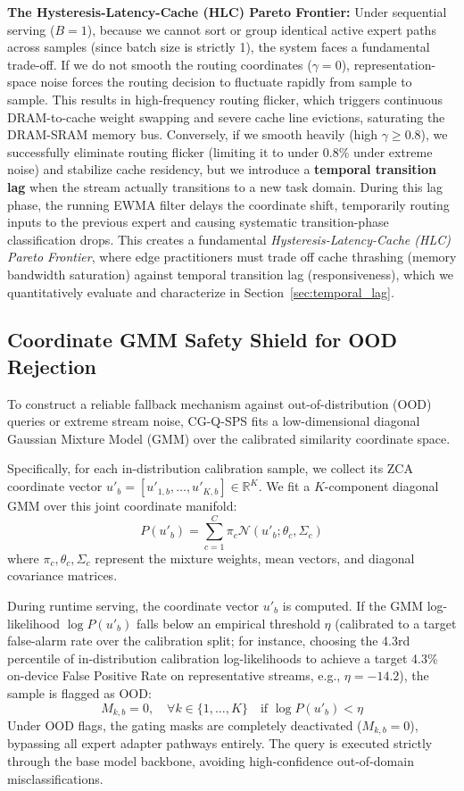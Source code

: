 \textbf{The Hysteresis-Latency-Cache (HLC) Pareto Frontier:} Under sequential serving ($B=1$), because we cannot sort or group identical active expert paths across samples (since batch size is strictly 1), the system faces a fundamental trade-off. If we do not smooth the routing coordinates ($\gamma = 0$), representation-space noise forces the routing decision to fluctuate rapidly from sample to sample. This results in high-frequency routing flicker, which triggers continuous DRAM-to-cache weight swapping and severe cache line evictions, saturating the DRAM-SRAM memory bus. Conversely, if we smooth heavily (high $\gamma \ge 0.8$), we successfully eliminate routing flicker (limiting it to under 0.8\% under extreme noise) and stabilize cache residency, but we introduce a \textbf{temporal transition lag} when the stream actually transitions to a new task domain. During this lag phase, the running EWMA filter delays the coordinate shift, temporarily routing inputs to the previous expert and causing systematic transition-phase classification drops. This creates a fundamental \textit{Hysteresis-Latency-Cache (HLC) Pareto Frontier}, where edge practitioners must trade off cache thrashing (memory bandwidth saturation) against temporal transition lag (responsiveness), which we quantitatively evaluate and characterize in Section~\ref{sec:temporal_lag}.

\subsection{Coordinate GMM Safety Shield for OOD Rejection}
To construct a reliable fallback mechanism against out-of-distribution (OOD) queries or extreme stream noise, CG-Q-SPS fits a low-dimensional diagonal Gaussian Mixture Model (GMM) over the calibrated similarity coordinate space.

Specifically, for each in-distribution calibration sample, we collect its ZCA coordinate vector $u'_b = [u'_{1, b}, \dots, u'_{K, b}] \in \mathbb{R}^K$. We fit a $K$-component diagonal GMM over this joint coordinate manifold:
\begin{equation}
  P(u'_b) = \sum_{c=1}^C \pi_c \mathcal{N}(u'_b; \theta_c, \Sigma_c)
\end{equation}
where $\pi_c, \theta_c, \Sigma_c$ represent the mixture weights, mean vectors, and diagonal covariance matrices. 

During runtime serving, the coordinate vector $u'_b$ is computed. If the GMM log-likelihood $\log P(u'_b)$ falls below an empirical threshold $\eta$ (calibrated to a target false-alarm rate over the calibration split; for instance, choosing the 4.3rd percentile of in-distribution calibration log-likelihoods to achieve a target 4.3\% on-device False Positive Rate on representative streams, e.g., $\eta = -14.2$), the sample is flagged as OOD:
\begin{equation}
  M_{k, b} = 0, \quad \forall k \in \{1, \dots, K\} \quad \text{if } \log P(u'_b) < \eta
\end{equation}
Under OOD flags, the gating masks are completely deactivated ($M_{k, b} = 0$), bypassing all expert adapter pathways entirely. The query is executed strictly through the base model backbone, avoiding high-confidence out-of-domain misclassifications.

